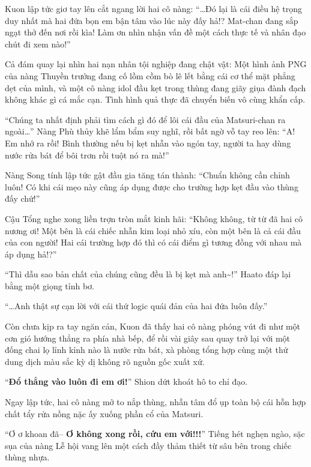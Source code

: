 \documentclass[../main.tex]{subfiles}
\begin{document}

Kuon lập tức giơ tay lên cắt ngang lời hai cô nàng: ``\dots Đó lại là cái điều hệ trọng duy nhất mà hai đứa bọn em bận tâm vào lúc này đấy hả!? Mat-chan đang sắp ngạt thở đến nơi rồi kìa! Làm ơn nhìn nhận vấn đề một cách thực tế và nhân đạo chút đi xem nào!''

Cả đám quay lại nhìn hai nạn nhân tội nghiệp đang chật vật: Một hình ảnh PNG của nàng Thuyền trưởng đang cố lồm cồm bò lê lết bằng cái cơ thể mặt phẳng dẹt của mình, và một cô nàng idol đầu kẹt trong thùng đang giãy giụa đành đạch không khác gì cá mắc cạn. Tình hình quả thực đã chuyển biến vô cùng khẩn cấp.

``Chúng ta nhất định phải tìm cách gì đó để lôi cái đầu của Matsuri-chan ra ngoài\dots'' Nàng Phù thủy khẽ lẩm bẩm suy nghĩ, rồi bất ngờ vỗ tay reo lên: ``A! Em nhớ ra rồi! Bình thường nếu bị kẹt nhẫn vào ngón tay, người ta hay dùng nước rửa bát để bôi trơn rồi tuột nó ra mà!''

Nàng Song tính lập tức gật đầu gia tăng tán thành: ``Chuẩn không cần chỉnh luôn! Có khi cái mẹo này cũng áp dụng được cho trường hợp kẹt đầu vào thùng đấy chứ!''

Cậu Tổng nghe xong liền trợn tròn mắt kinh hãi: ``Không không, từ từ đã hai cô nương ơi! Một bên là cái chiếc nhẫn kim loại nhỏ xíu, còn một bên là cả cái đầu của con người! Hai cái trường hợp đó thì có cái điểm gì tương đồng với nhau mà áp dụng hả!?''

``Thì dẫu sao bản chất của chúng cũng đều là bị kẹt mà anh\~{}!'' Haato đáp lại bằng một giọng tỉnh bơ.

``\dots Anh thật sự cạn lời với cái thứ logic quái đản của hai đứa luôn đấy.''

Còn chưa kịp ra tay ngăn cản, Kuon đã thấy hai cô nàng phóng vút đi như một cơn gió hướng thẳng ra phía nhà bếp, để rồi vài giây sau quay trở lại với một đống chai lọ lỉnh kỉnh nào là nước rửa bát, xà phòng tổng hợp cùng một thứ dung dịch màu sắc kỳ dị không rõ nguồn gốc xuất xứ.

``\textbf{Đổ thẳng vào luôn đi em ơi!}'' Shion dứt khoát hô to chỉ đạo.

Ngay lập tức, hai cô nàng mở to nắp thùng, nhẫn tâm đổ ụp toàn bộ cái hỗn hợp chất tẩy rửa nồng nặc ấy xuống phần cổ của Matsuri.

``Ơ ơ khoan đã-- \textbf{Ơ không xong rồi, cứu em với!!!}'' Tiếng hét nghẹn ngào, sặc sụa của nàng Lễ hội vang lên một cách đầy thảm thiết từ sâu bên trong chiếc thùng nhựa.
\end{document}
